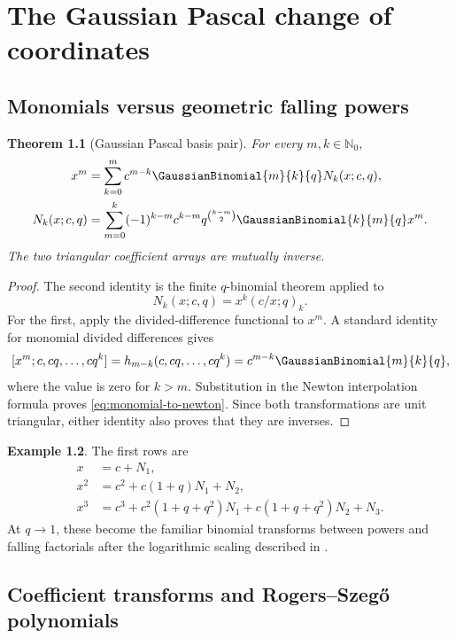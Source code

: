 \documentclass[11pt,oneside]{book}
\numberwithin{equation}{chapter}
\newtheorem{theorem}{Theorem}[chapter]
\theoremstyle{definition}
\newtheorem{example}[theorem]{Example}
\theoremstyle{remark}
\newcommand{\Nzero}{\mathbb N_0}
\begin{document}
\chapter{The Gaussian Pascal change of coordinates}
\label{chap:gaussian-pascal}

\section{Monomials versus geometric falling powers}

\begin{theorem}[Gaussian Pascal basis pair]
\label{thm:gaussian-pascal-basis}
For every $m,k\in\Nzero$,
\begin{align}
 x^m
 &=\sum_{k=0}^m c^{m-k}\GaussianBinomial{m}{k}{q}N_k(x;c,q),
 \label{eq:monomial-to-newton}\\
 N_k(x;c,q)
 &=\sum_{m=0}^k(-1)^{k-m}c^{k-m}
   q^{\binom{k-m}{2}}\GaussianBinomial{k}{m}{q}x^m.
 \label{eq:newton-to-monomial}
\end{align}
The two triangular coefficient arrays are mutually inverse.
\end{theorem}

\begin{proof}
The second identity is the finite $q$-binomial theorem applied to
\[
 N_k(x;c,q)=x^k(c/x;q)_k.
\]
For the first, apply the divided-difference functional to $x^m$.  A standard
identity for monomial divided differences gives
\[
 [x^m;c,cq,\ldots,cq^k]
 =h_{m-k}(c,cq,\ldots,cq^k)
 =c^{m-k}\GaussianBinomial{m}{k}{q},
\]
where the value is zero for $k>m$.  Substitution in the Newton interpolation
formula proves \eqref{eq:monomial-to-newton}.  Since both transformations are
unit triangular, either identity also proves that they are inverses.
\end{proof}

\begin{example}
The first rows are
\begin{align*}
 x&=c+N_1,\\
 x^2&=c^2+c(1+q)N_1+N_2,\\
 x^3&=c^3+c^2(1+q+q^2)N_1
       +c(1+q+q^2)N_2+N_3.
\end{align*}
At $q\to1$, these become the familiar binomial transforms between powers and
falling factorials after the logarithmic scaling described in
.
\end{example}

\section{Coefficient transforms and Rogers--Szeg\H{o} polynomials}
\end{document}
